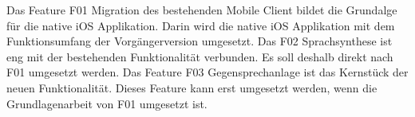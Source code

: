 Das Feature F01 Migration des bestehenden Mobile Client bildet die Grundalge für die native iOS Applikation.
Darin wird die native iOS Applikation mit dem Funktionsumfang der Vorgängerversion umgesetzt.
Das F02 Sprachsynthese ist eng mit der bestehenden Funktionalität verbunden.
Es soll deshalb direkt nach F01 umgesetzt werden.
Das Feature F03 Gegensprechanlage ist das Kernstück der neuen Funktionalität.
Dieses Feature kann erst umgesetzt werden, wenn die Grundlagenarbeit von F01 umgesetzt ist.

\clearpage
